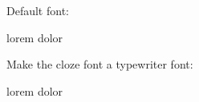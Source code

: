 


{}

Default font:

lorem  dolor

Make the cloze font a typewriter font:

\clozesetfont{\tt}

lorem  dolor

\bye
